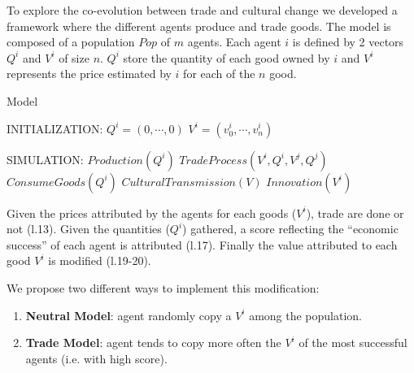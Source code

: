 \documentclass[a1paper,landscape,showframe,fontscale=.42]{baposter}
\newcommand{\compresslist}{
	\setlength{\itemsep}{1pt}
	\setlength{\parskip}{0pt}
	\setlength{\parsep}{0pt}
}
\begin{document}
\begin{poster}
{To explore the co-evolution between trade and cultural change we developed a framework where the different agents produce and trade goods. The model is composed of a population $Pop$ of $m$ agents. Each agent $i$ is defined by 2 vectors $Q^i$ and $V^i$ of size $n$. $Q^i$ store the quantity of each good owned by $i$ and $V^i$ represents the price estimated by $i$ for each of the $n$ good.
\begin{algorithm}[H]
\caption{Model}
\label{algo:complete}
	\begin{algorithmic}[1]
	\scriptsize
	\State INITIALIZATION: 
		 
				\State $Q^i = (0, \cdots, 0)$
				\State $V^i = (v^i_0, \cdots, v^i_n)$ 
		\EndFor

	\State SIMULATION:
				\State $Production(Q^i)$
			\EndFor
					\State $TradeProcess(V^i,Q^i,V^j,Q^j)$
				\EndFor		
			\EndFor
				\State $ConsumeGoods(Q^i)$ 
					\State $CulturalTransmission(V)$
					\State $Innovation(V^i)$
				\EndIf
			\EndFor
		\EndLoop
\end{algorithmic}
\end{algorithm}
Given the prices attributed by the agents for each goods ($V^i$), trade are done or not (l.13). Given the quantities ($Q^i$) gathered, a score reflecting the ``economic success'' of each agent is attributed (l.17). Finally the value attributed to each good $V^i$ is modified (l.19-20).

We propose two different ways to implement this modification: 
\vspace{-.15cm}
\begin{enumerate}
		\compresslist
	\item \textbf{Neutral Model}: agent randomly copy a $V^i$ among the population.
	\item \textbf{Trade Model}: agent tends to copy more often the $V^i$ of the most successful agents (i.e. with high score).
\end{enumerate}
}




\end{poster}
\end{document}
